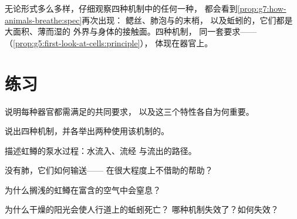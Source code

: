 \begin{remark}[共同要求从不改变]\label{rem:g7:how-animals-breathe:same}
无论形式多么多样，仔细观察四种机制中的任何一种，
都会看到\cref{prop:g7:how-animals-breathe:spec}再次出现：
鳃丝、肺泡与的末梢，
以及蚯蚓的，它们都是大面积、薄而湿的
外界与身体的接触面。四种机制，
同一套要求——
（\cref{prop:g5:first-look-at-cells:principle}），
体现在器官上。
\end{remark}

\section{练习}

\begin{exercise}[$\star$]\label{exo:g7:how-animals-breathe:1}
说明每种器官都需满足的共同要求，
以及这三个特性各自为何重要。
\end{exercise}

\begin{exercise}[$\star$]\label{exo:g7:how-animals-breathe:2}
说出四种机制，并各举出两种使用该机制的。
\end{exercise}

\begin{exercise}[$\star$]\label{exo:g7:how-animals-breathe:3}
描述虹鳟的泵水过程：水流入、流经
与流出的路径。
\end{exercise}

\begin{exercise}[$\star$]\label{exo:g7:how-animals-breathe:4}
没有肺，它们如何输送——
在很大程度上不借助的帮助？
\end{exercise}

\begin{exercise}[$\star$]\label{exo:g7:how-animals-breathe:5}
为什么搁浅的虹鳟在富含的空气中会窒息？
\end{exercise}

\begin{exercise}[$\star$]\label{exo:g7:how-animals-breathe:6}
为什么干燥的阳光会使人行道上的蚯蚓死亡？
哪种机制失效了？如何失效？
\end{exercise}

